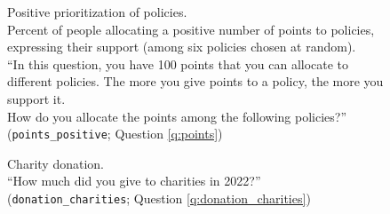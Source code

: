 \begin{figure}[h!] 
    \cprotect\caption[Positive prioritization of policies]{Positive prioritization of policies. \\ Percent of people allocating a positive number of points to policies, expressing their support (among six policies chosen at random). \\ ``In this question, you have 100 points that you can allocate to different policies. The more you give points to a policy, the more you support it. \\ How do you allocate the points among the following policies?'' (\verb|points_positive|; Question \ref{q:points})}\label{fig:points_positive}
\end{figure}

\begin{figure}[h!]
    \cprotect\caption[Charity donation]{Charity donation. \\ ``How much did you give to charities in 2022?'' (\verb|donation_charities|; Question \ref{q:donation_charities})}\label{fig:donation_charities}
\end{figure}

